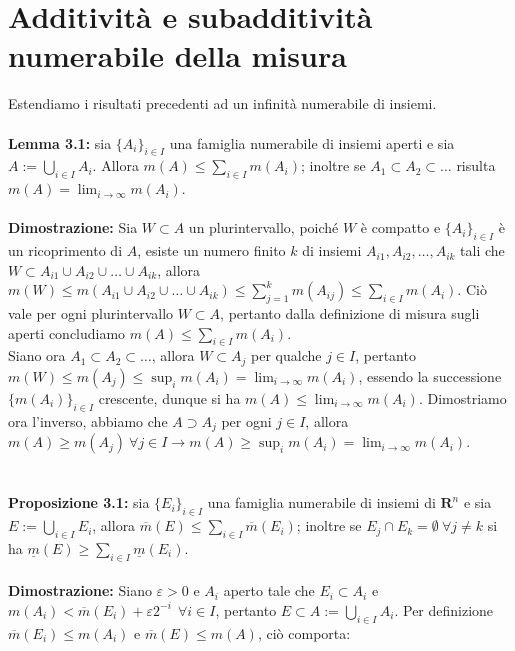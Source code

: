 \documentclass{article}
\begin{document}
\section{Additività e subadditività numerabile della misura}
Estendiamo i risultati precedenti ad un infinità numerabile di insiemi. \\ \\
\textbf{Lemma 3.1:} sia $\{ A_i \}_{i \in I}$ una famiglia numerabile di insiemi aperti e sia $A := \bigcup_{i \in I} A_i$. Allora $m(A) \leq \sum_{i \in I} m(A_i)$; inoltre se $A_1 \subset A_2 \subset \dots$ risulta $m(A) = \lim_{i \rightarrow \infty} m(A_i)$. \\ \\
\textbf{Dimostrazione:} Sia $W \subset A$ un plurintervallo, poiché $W$ è compatto e $\{ A_i \}_{i \in I}$ è un ricoprimento di $A$, esiste un numero finito $k$ di insiemi $A_{i1}, A_{i2}, \dots, A_{ik}$ tali che $W \subset A_{i1} \cup A_{i2} \cup \dots \cup A_{ik}$, allora $m(W) \leq m(A_{i1} \cup A_{i2} \cup \dots \cup A_{ik}) \leq \sum_{j = 1}^k m(A_{ij}) \leq \sum_{i \in I} m(A_i)$. Ciò vale per ogni plurintervallo $W \subset A$, pertanto dalla definizione di misura sugli aperti concludiamo $m(A) \leq \sum_{i \in I}m(A_i)$. \\
Siano ora $A_1 \subset A_2 \subset \dots$, allora $W \subset A_j$ per qualche $j \in I$, pertanto $m(W) \leq m(A_j) \leq \sup_i m(A_i) = \lim_{i \rightarrow \infty} m(A_i)$, essendo la successione $\{ m(A_i) \}_{i \in I}$ crescente, dunque si ha $m(A) \leq \lim_{i \rightarrow \infty} m(A_i)$. Dimostriamo ora l'inverso, abbiamo che $A \supset A_j$ per ogni $j \in I$, allora $m(A) \geq m(A_j) \ \forall j \in I \rightarrow m(A) \geq \sup_i m(A_i) = \lim_{i \rightarrow \infty} m(A_i)$. \\ \\ \\
\textbf{Proposizione 3.1:} sia $\{ E_i \}_{i \in I}$ una famiglia numerabile di insiemi di $\mathbf{R}^n$ e sia $E := \bigcup_{i \in I} E_i$, allora $\overline{m}(E) \leq \sum_{i \in I} \overline{m}(E_i)$; inoltre se $E_j \cap E_k = \emptyset \ \forall j \neq k$ si ha $\underline{m}(E) \geq \sum_{i \in I} \underline{m}(E_i)$. \\ \\
\textbf{Dimostrazione:} Siano $\varepsilon > 0$ e $A_i$ aperto tale che $E_i \subset A_i$ e $m(A_i) < \overline{m}(E_i) + \varepsilon2^{-i} \ \ \forall i \in I$, pertanto $E \subset A := \bigcup_{i \in I} A_i$. Per definizione $\overline{m}(E_i) \leq m(A_i)$ e $\overline{m}(E) \leq m(A)$, ciò comporta:
\end{document}
